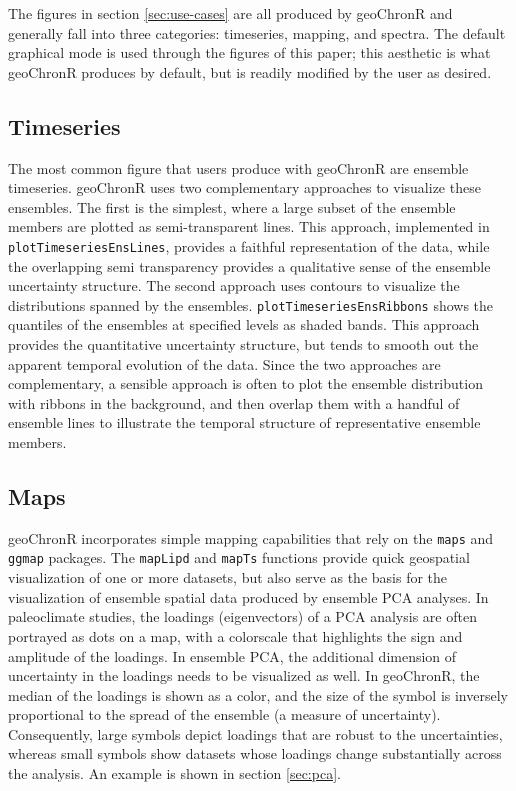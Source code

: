 \documentclass[gchron, manuscript]{copernicus}
\begin{document}
The figures in section \ref{sec:use-cases} are all produced by geoChronR and generally fall into three categories: timeseries, mapping, and spectra.
The default graphical mode is used through the figures of this paper; this aesthetic is what geoChronR produces by default, but is readily modified by the user as desired.

\subsection{Timeseries}

The most common figure that users produce with geoChronR are ensemble timeseries.
geoChronR uses two complementary approaches to visualize these ensembles.
The first is the simplest, where a large subset of the ensemble members are plotted as semi-transparent lines.
This approach, implemented in \texttt{plotTimeseriesEnsLines}, provides a faithful representation of the data, while the overlapping semi transparency provides a qualitative sense of the ensemble uncertainty structure.
The second approach uses contours to visualize the distributions spanned by the ensembles.
\texttt{plotTimeseriesEnsRibbons} shows the quantiles of the ensembles at specified levels as shaded bands.
This approach provides the quantitative uncertainty structure, but tends to smooth out the apparent temporal evolution of the data.
Since the two approaches are complementary, a sensible approach is often to plot the ensemble distribution with ribbons in the background, and then overlap them with a handful of ensemble lines to illustrate the temporal structure of representative ensemble members.

\subsection{Maps}

geoChronR incorporates simple mapping capabilities that rely on the \texttt{maps} \citep{maps} and \texttt{ggmap} \citep{ggmap} packages.
The \texttt{mapLipd} and \texttt{mapTs} functions provide quick geospatial visualization of one or more datasets, but also serve as the basis for the visualization of ensemble spatial data produced by ensemble PCA analyses.
In paleoclimate studies, the loadings (eigenvectors) of a PCA analysis are often portrayed as dots on a map, with a colorscale that highlights the sign and amplitude of the loadings.
In ensemble PCA, the additional dimension of uncertainty in the loadings needs to be visualized as well.
In geoChronR, the median of the loadings is shown as a color, and the size of the symbol is inversely proportional to the spread of the ensemble (a measure of uncertainty).
Consequently, large symbols depict loadings that are robust to the uncertainties, whereas small symbols show datasets whose loadings change substantially across the analysis.
An example is shown in section \ref{sec:pca}.
\end{document}
